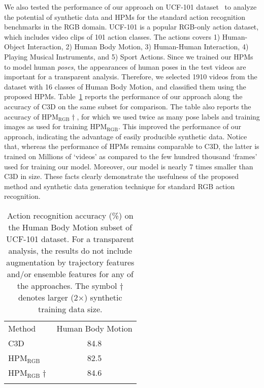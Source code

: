 \documentclass[twocolumn]{svjour3}          \smartqed  \usepackage{graphicx}
\begin{document}
We also tested the  performance of our approach on UCF-101 dataset~\citep{soomro2012ucf101} to analyze the potential of synthetic data and HPMs for the standard action recognition benchmarks in the RGB domain. UCF-101 is a popular RGB-only action dataset, which includes video clips of 101 action classes. The actions covers 1) Human-Object Interaction, 2) Human Body Motion, 3) Human-Human Interaction, 4) Playing Musical Instruments, and 5) Sport Actions. Since we trained our HPMs to model human \emph{poses}, the appearances of human poses in the test videos are important for a transparent analysis.  Therefore, we selected 1910 videos from the dataset with 16 classes of Human Body Motion, and classified them  using the proposed HPMs.
Table~\ref{tab:ucf101_compare} reports the performance of our approach along the accuracy  of C3D on the same subset for comparison. The table also reports the accuracy of HPM$_{\text{RGB}}\dagger$, for which we used twice as many pose labels and training images as used for training HPM$_{\text{RGB}}$.  
 This improved the performance of  our approach, indicating the advantage of easily producible synthetic data. Notice that, whereas  the performance of HPMs remains comparable to C3D, the latter is trained on Millions of `videos' as compared to the few hundred thousand `frames' used for training our model.  Moreover, our model is nearly 7 times smaller than C3D   in size.  These facts clearly demonstrate the usefulness of the proposed method and synthetic data generation technique for standard RGB action recognition.


\begin{table}[t]
\centering
\caption{Action recognition accuracy (\%) on the Human Body Motion subset of  UCF-101 dataset. For a transparent analysis, the results do not include augmentation by trajectory features and/or ensemble features for any of the approaches. The symbol $\dagger$ denotes larger (2$\times$) synthetic training data size. }
\label{tab:ucf101_compare}
\begin{tabular}{lc}
\hline\noalign{\smallskip}
Method & \multicolumn{1}{l}{Human Body Motion} \\ \noalign{\smallskip}\hline\noalign{\smallskip}

C3D & 84.8 \\ HPM$_{\mathrm{RGB}}$ & 82.5 \\ HPM$_{\mathrm{RGB}}\dagger$ & 84.6 \\ 

\hline\noalign{\smallskip}
\end{tabular}
\end{table}
\end{document}
